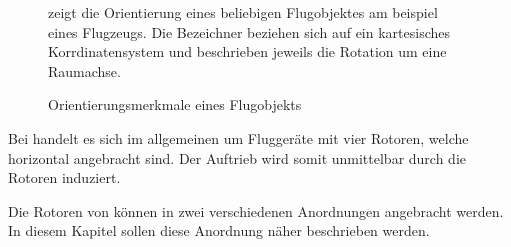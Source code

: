 








\begin{figure}[ht!]
\vspace{0.25cm}
\begin{center}
\caption{Orientierungsmerkmale eines Flugobjekts \cite{parotSDK}}
\label{fig:Orient}
\end{center}

\vspace{0.25cm}
 zeigt die Orientierung eines beliebigen Flugobjektes am beispiel eines Flugzeugs. Die Bezeichner beziehen sich auf ein kartesisches Korrdinatensystem und beschrieben jeweils die Rotation um eine Raumachse.
\end{figure}






Bei \Quad[n] handelt es sich im allgemeinen um Fluggeräte mit vier Rotoren, welche horizontal angebracht sind. Der Auftrieb wird somit unmittelbar durch die Rotoren induziert.

Die Rotoren von \Quad[n] können in zwei verschiedenen Anordnungen angebracht werden. In diesem Kapitel sollen diese Anordnung näher beschrieben werden.




